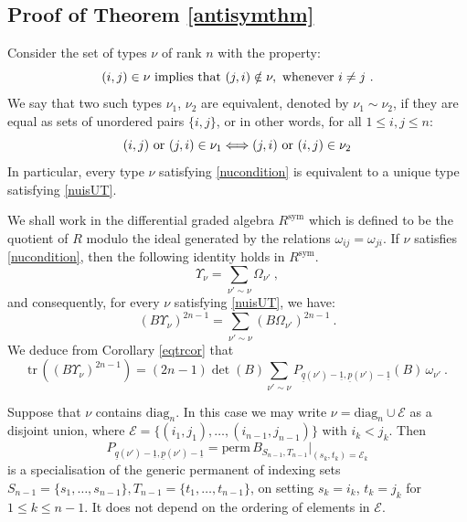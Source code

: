 \documentclass[10pt]{amsart}
\newcommand{\sE}{\mathcal{E}}
\newcommand{\pp}{{\underline{p}}}
\newcommand{\qq}{{\underline{q}}}
\newcommand{\tr}{\mathrm{tr}\,}
\newcommand{\diag}{\mathrm{diag}}
\newcommand{\one}{{\underline{1}}}
\newcommand{\perm}{\mathrm{perm}\,}
\theoremstyle{plain}
\newcommand{\0}{\color{blue}{\mathsf{0}}}
\begin{document}
\subsection{Proof of Theorem \ref{antisymthm}}
Consider the set of types $\nu$ of rank $n$ with the property:
\begin{equation} \label{nucondition} (i,j) \in \nu  \hbox{ implies that }  (j,i) \notin \nu , \hbox{  whenever  }  i\neq j \ .
\end{equation}
We say that two such types $\nu_1$, $\nu_2$ 
are equivalent, denoted by $\nu_1 \sim \nu_2$, if they are equal as sets of unordered pairs $\{i,j\}$, or in other words,  for all $1\leq i,j \leq n$:
\[  (i,j ) \hbox{ or } (j,i)  \in \nu_1       \Longleftrightarrow  (j,i) \hbox{ or } (i,j) \in \nu_2 \]
In particular, every type $\nu$  satisfying \eqref{nucondition} is equivalent to a unique type satisfying \eqref{nuisUT}. 


We shall   work in the differential graded algebra $R^{\mathrm{sym}}$ which is  defined to be the quotient of $R$ modulo the ideal generated by the relations $\omega_{ij}=\omega_{ji}$.
If $\nu$ satisfies   \eqref{nucondition}, then the following   identity holds in $R^{\mathrm{sym}}$.
\[  \Upsilon_{\nu} = \sum_{\nu' \sim \nu} \Omega_{\nu'} \ , \]
and consequently,  for every $\nu$ satisfying \eqref{nuisUT}, we have: 
\[  (B\Upsilon_{\nu})^{2n-1} = \sum_{\nu' \sim \nu} (B \Omega_{\nu'})^{2n-1} \ . \]
We  deduce from Corollary \ref{eqtrcor} that 
\[ \tr\left( (B\Upsilon_{\nu})^{2n-1}\right) = (2n-1) \det(B) \sum_{\nu' \sim \nu} P_{\qq(\nu')-\one, \pp(\nu')-\one  }(B)  \, \omega_{\nu'} \ . \]


Suppose that $\nu$ contains $\diag_n$. In this case we may write $\nu= \diag_n \cup \sE$ as a disjoint union, where $\sE = \{(i_1,j_1), \ldots, (i_{n-1},j_{n-1})\}$ with  $i_k<j_k$.  Then
\[  P_{\qq(\nu')-\one, \pp(\nu')-\one  } = \perm B_{S_{n-1},T_{n-1}} \Big|_{(s_k,t_k) = \sE_k}\]
is a specialisation of the generic permanent of indexing sets $S_{n-1}=\{s_1,\ldots, s_{n-1}\}, T_{n-1}=\{t_1,\ldots, t_{n-1}\}$, on setting $s_k=i_k$, $t_k=j_k$ for $1\leq k \leq n-1$. It does not depend on the ordering of elements in $\sE$. 
\end{document}
